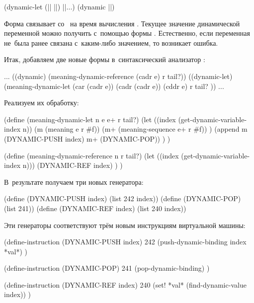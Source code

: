 \begin{code:lisp}
(dynamic-let (|| ||) ||...)
(dynamic ||)
\end{code:lisp}

Форма  связывает  со~ на время
вычисления . Текущее значение динамической переменной можно получить
с~помощью формы . Естественно, если переменная не~была ранее связана
с~каким-либо значением, то возникает ошибка.

Итак, добавляем две новые формы в~синтаксический анализатор :

\begin{code:lisp}
...
((dynamic)     (meaning-dynamic-reference (cadr e) r tail?))
((dynamic-let) (meaning-dynamic-let (car (cadr e))
                                    (cadr (cadr e))
                                    (cddr e) r tail? ))
...
\end{code:lisp}

Реализуем их обработку:

\begin{code:lisp}
(define (meaning-dynamic-let n e e+ r tail?)
  (let ((index (get-dynamic-variable-index n))
        (m (meaning e r #f))
        (m+ (meaning-sequence e+ r #f)) )
    (append m (DYNAMIC-PUSH index) m+ (DYNAMIC-POP)) ) )

(define (meaning-dynamic-reference n r tail?)
  (let ((index (get-dynamic-variable-index n)))
    (DYNAMIC-REF index) ) )
\end{code:lisp}

В~результате получаем три новых генератора:

\begin{code:lisp}
(define (DYNAMIC-PUSH index) (list 242 index))
(define (DYNAMIC-POP)        (list 241))
(define (DYNAMIC-REF index)  (list 240 index))
\end{code:lisp}

Эти генераторы соответствуют трём новым инструкциям виртуальной машины:

\begin{code:lisp}
(define-instruction (DYNAMIC-PUSH index) 242
  (push-dynamic-binding index *val*) )

(define-instruction (DYNAMIC-POP) 241
  (pop-dynamic-binding) )

(define-instruction (DYNAMIC-REF index) 240
  (set! *val* (find-dynamic-value index)) )
\end{code:lisp}


